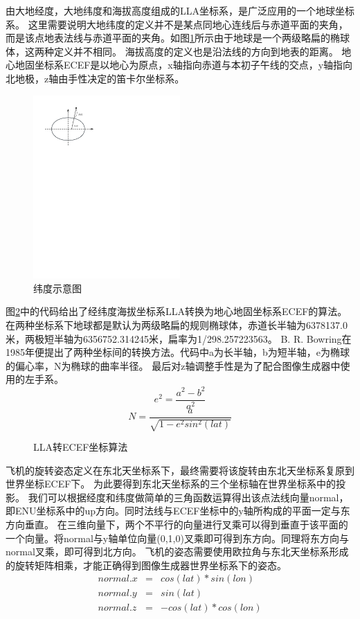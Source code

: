 \par
由大地经度，大地纬度和海拔高度组成的LLA坐标系，是广泛应用的一个地球坐标系。
这里需要说明大地纬度的定义并不是某点同地心连线后与赤道平面的夹角，而是该点地表法线与赤道平面的夹角。如图\ref{latitude}所示由于地球是一个两级略扁的椭球体，这两种定义并不相同。
海拔高度的定义也是沿法线的方向到地表的距离。
地心地固坐标系ECEF是以地心为原点，x轴指向赤道与本初子午线的交点，y轴指向北地极，z轴由手性决定的笛卡尔坐标系。
\begin{figure}[h!]
    \begin{center}
        \includegraphics[width=0.5\textwidth]{pictures/latitude.pdf}
        \caption{纬度示意图}
        \label{latitude}
    \end{center}
\end{figure}
\par
图\ref{LLA2ECEF}中的代码给出了经纬度海拔坐标系LLA转换为地心地固坐标系ECEF的算法。
在两种坐标系下地球都是默认为两级略扁的规则椭球体，赤道长半轴为6378137.0米，两极短半轴为6356752.314245米，扁率为1/298.257223563。
B. R. Bowring在1985年便提出了两种坐标间的转换方法\cite{cha4}。代码中a为长半轴，b为短半轴，e为椭球的偏心率，N为椭球的曲率半径。
最后对z轴调整手性是为了配合图像生成器中使用的左手系。
$$e^2=\frac{a^2-b^2}{a^2}$$
$$N=\frac{a}{\sqrt{1-e^2sin^2(lat)}}$$
\begin{figure}[h!]
    \begin{center}
        
        \caption{LLA转ECEF坐标算法}
        \label{LLA2ECEF}
    \end{center}
\end{figure}
\par
飞机的旋转姿态定义在东北天坐标系下，最终需要将该旋转由东北天坐标系复原到世界坐标ECEF下。
为此要得到东北天坐标系的三个坐标轴在世界坐标系中的投影。
我们可以根据经度和纬度做简单的三角函数运算得出该点法线向量normal，即ENU坐标系中的up方向。同时法线与ECEF坐标中的y轴所构成的平面一定与东方向垂直。
在三维向量下，两个不平行的向量进行叉乘可以得到垂直于该平面的一个向量。将normal与y轴单位向量(0,1,0)叉乘即可得到东方向。同理将东方向与normal叉乘，即可得到北方向。
飞机的姿态需要使用欧拉角与东北天坐标系形成的旋转矩阵相乘，才能正确得到图像生成器世界坐标系下的姿态。
\begin{eqnarray}    \label{eq}
    normal.x&=&cos(lat) * sin(lon)  \nonumber    \\
    normal.y&=&sin(lat) \nonumber    \\
    normal.z&=&-cos(lat) * cos(lon) \nonumber
\end{eqnarray}
